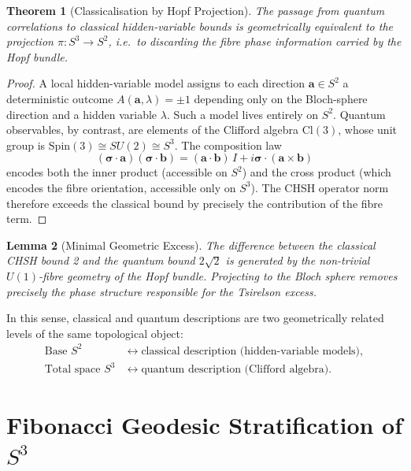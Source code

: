 \documentclass[12pt,a4paper]{article}
\newtheorem{theorem}{Theorem}[section]
\newtheorem{lemma}[theorem]{Lemma}
\theoremstyle{definition}
\theoremstyle{remark}
\begin{document}
\begin{theorem}[Classicalisation by Hopf Projection]
The passage from quantum correlations to classical hidden-variable bounds is
geometrically equivalent to the projection $\pi: S^3 \to S^2$, i.e.\ to discarding
the fibre phase information carried by the Hopf bundle.
\end{theorem}

\begin{proof}
A local hidden-variable model assigns to each direction $\mathbf{a}\in S^2$ a
deterministic outcome $A(\mathbf{a},\lambda)=\pm 1$ depending only on the
Bloch-sphere direction and a hidden variable $\lambda$. Such a model lives entirely
on $S^2$. Quantum observables, by contrast, are elements of the Clifford algebra
$\mathrm{Cl}(3)$, whose unit group is $\mathrm{Spin}(3)\cong SU(2)\cong S^3$.
The composition law
\[
(\boldsymbol{\sigma}\cdot\mathbf{a})(\boldsymbol{\sigma}\cdot\mathbf{b})
= (\mathbf{a}\cdot\mathbf{b})\,I + i\boldsymbol{\sigma}\cdot(\mathbf{a}\times\mathbf{b})
\]
encodes both the inner product (accessible on $S^2$) and the cross product (which
encodes the fibre orientation, accessible only on $S^3$). The CHSH operator norm
therefore exceeds the classical bound by precisely the contribution of the fibre term.
\end{proof}

\begin{lemma}[Minimal Geometric Excess]
The difference between the classical CHSH bound 2 and the quantum bound $2\sqrt{2}$
is generated by the non-trivial $U(1)$-fibre geometry of the Hopf bundle. Projecting
to the Bloch sphere removes precisely the phase structure responsible for the
Tsirelson excess.
\end{lemma}

In this sense, classical and quantum descriptions are two geometrically related
levels of the same topological object:
\begin{align*}
\text{Base }S^2 &\longleftrightarrow \text{classical description (hidden-variable models)},\\
\text{Total space }S^3 &\longleftrightarrow \text{quantum description (Clifford algebra)}.
\end{align*}

\section{Fibonacci Geodesic Stratification of $S^3$}
\label{sec:fibonacci}
\end{document}
